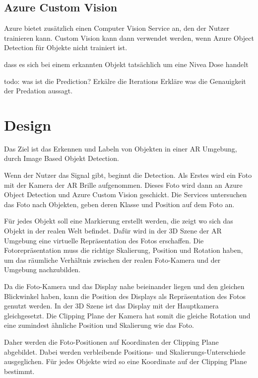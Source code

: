 \documentclass[german,a4paper, 12pt]{llncs}
\begin{document}
\subsection{Azure Custom Vision}
Azure bietet zusätzlich einen Computer Vision Service an, den der Nutzer trainieren kann. Custom Vision kann dann verwendet werden, wenn Azure Object Detection für Objekte nicht trainiert ist.\cite{Azure302bDoc}


dass es sich bei einem erkannten Objekt tatsächlich um eine Nivea Dose handelt


todo: was ist die Prediction? 
Erkälre die Iterations
Erkläre was die Genauigkeit der Predation aussagt.



\section{Design}

Das Ziel ist das Erkennen und Labeln von Objekten in einer AR Umgebung, durch Image Based Objekt Detection.

Wenn der Nutzer das Signal gibt, beginnt die Detection. Als Erstes wird ein Foto mit der Kamera der AR Brille aufgenommen. 
Dieses Foto wird dann an Azure Object Detection und Azure Custom Vision geschickt. 
Die Services untersuchen das Foto nach Objekten, geben deren Klasse und Position auf dem Foto an.

Für jedes Objekt soll eine Markierung erstellt werden, die zeigt wo sich das Objekt in der realen Welt befindet.
Dafür wird in der 3D Szene der AR Umgebung eine virtuelle Repräsentation des Fotos erschaffen. Die Fotorepräsentation muss die richtige Skalierung, Position und Rotation haben, um das räumliche Verhältnis zwischen der realen Foto-Kamera und der Umgebung nachzubilden.

Da die Foto-Kamera und das Display nahe beieinander liegen und den gleichen Blickwinkel haben, kann die Position des Displays als Repräsentation des Fotos genutzt werden. In der 3D Szene ist das Display mit der Hauptkamera gleichgesetzt. Die Clipping Plane der Kamera hat somit die gleiche Rotation und eine zumindest ähnliche Position und Skalierung wie das Foto. 

Daher werden die Foto-Positionen auf Koordinaten der Clipping Plane abgebildet. Dabei werden verbleibende Positions- und Skalierungs-Unterschiede ausgeglichen. Für jedes Objekte wird so eine Koordinate auf der Clipping Plane bestimmt. 
\end{document}
